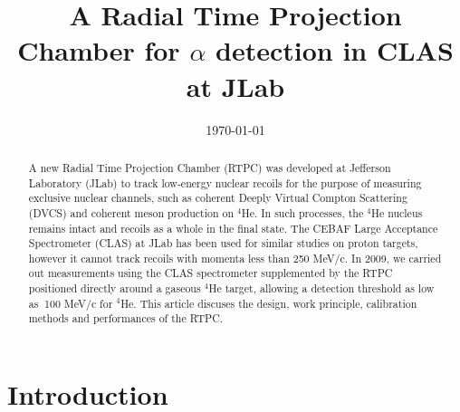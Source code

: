 \documentclass[twocolumn,showpacs,superscriptaddress,groupedaddress]{revtex4}
\begin{document}

\title{\vspace{-15mm}\fontsize{24pt}{10pt}\selectfont\textbf{A Radial Time 
Projection Chamber for $\alpha$ detection in CLAS at JLab}}
  

\date{\today}

\begin{abstract}
A new Radial Time Projection Chamber (RTPC) was developed at Jefferson 
Laboratory (JLab) to track low-energy nuclear recoils for the purpose of 
measuring exclusive nuclear channels, such as coherent Deeply Virtual Compton 
Scattering (DVCS) and coherent meson production on $^4$He. In such 
processes, the $^4$He nucleus remains intact and recoils as a whole in the final 
state. The CEBAF Large Acceptance Spectrometer (CLAS) at JLab has been used for 
similar studies on proton targets, however it cannot track recoils with momenta 
less than 250 MeV/c. In 2009, we carried out measurements using the CLAS spectrometer supplemented by the RTPC positioned directly around a gaseous $^4$He target, allowing a detection threshold as low as $~$100  MeV/c for 
$^4$He. This article discuses the design, work principle, calibration 
methods and performances of the RTPC.
\end{abstract}

\maketitle


\section{Introduction} \label{sec:level1}
\end{document}
